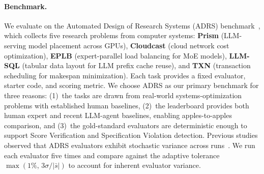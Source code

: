 

\paragraph{Benchmark.}
We evaluate on the Automated Design of Research Systems (ADRS) benchmark~\citep{cheng2025barbarians, cheng2025letthebarbarians}, which collects five research problems from computer systems: \textbf{Prism} (LLM-serving model placement across GPUs), \textbf{Cloudcast} (cloud network cost optimization), \textbf{EPLB} (expert-parallel load balancing for MoE models), \textbf{LLM-SQL} (tabular data layout for LLM prefix cache reuse), and \textbf{TXN} (transaction scheduling for makespan minimization).
Each task provides a fixed evaluator, starter code, and scoring metric.
We choose ADRS as our primary benchmark for three reasons: (1)~the tasks are drawn from real-world systems-optimization problems with established human baselines, (2)~the leaderboard provides both human expert and recent LLM-agent baselines, enabling apples-to-apples comparison, and (3)~the gold-standard evaluators are deterministic enough to support Score Verification and Specification Violation detection.
Previous studies observed that ADRS evaluators exhibit stochastic variance across runs~\citep{cemri2026adaevolve, liu2026evox}. We run each evaluator five times and compare against the adaptive tolerance $\max(1\%,\, 3\sigma/|\bar{s}|)$ to account for inherent evaluator variance.

